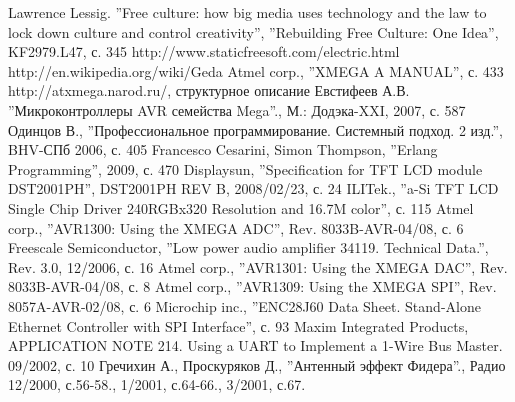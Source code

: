 \documentclass[russian,utf8,14pt,emptystyle,pointsubsection,reduceheight=0mm]{eskdtext}
\begin{document}
\begin{thebibliography}{99}
 Lawrence Lessig. ''Free culture: how big media uses technology and the law to lock down culture and control creativity'', ''Rebuilding Free Culture: One Idea'', KF2979.L47, с. 345
 http://www.staticfreesoft.com/electric.html
 http://en.wikipedia.org/wiki/Geda
 Atmel corp., ''XMEGA A MANUAL'', с. 433
 http://atxmega.narod.ru/, структурное описание
 Евстифеев А.В. ''Микроконтроллеры AVR семейства Mega''., М.: Додэка-XXI, 2007, с. 587
 Одинцов В., ''Профессиональное программирование. Системный подход. 2 изд.'', BHV-СПб 2006, с. 405
 Francesco Cesarini, Simon Thompson, ''Erlang Programming'', 2009, с. 470
 Displaysun, ''Specification for TFT LCD module DST2001PH'', DST2001PH REV B, 2008/02/23, с. 24
 ILITek., ''a-Si TFT LCD Single Chip Driver 240RGBx320 Resolution and 16.7M color'', с. 115
 Atmel corp., ''AVR1300: Using the XMEGA ADC'', Rev. 8033B-AVR-04/08, с. 6
 Freescale Semiconductor, ''Low power audio amplifier 34119. Technical Data.'', Rev. 3.0, 12/2006, с. 16
 Atmel corp., ''AVR1301: Using the XMEGA DAC'', Rev. 8033B-AVR-04/08, с. 8
 Atmel corp., ''AVR1309: Using the XMEGA SPI'', Rev. 8057A-AVR-02/08, с. 6
 Microchip inc., ''ENC28J60 Data Sheet. Stand-Alone Ethernet Controller with SPI Interface'', с. 93
 Maxim Integrated Products, APPLICATION NOTE 214. Using a UART to Implement a 1-Wire Bus Master. 09/2002, с. 10
 Гречихин А., Проскуряков Д., ''Антенный эффект Фидера''., Радио 12/2000, с.56-58., 1/2001, с.64-66., 3/2001, с.67.
\end{thebibliography}


\end{document}
